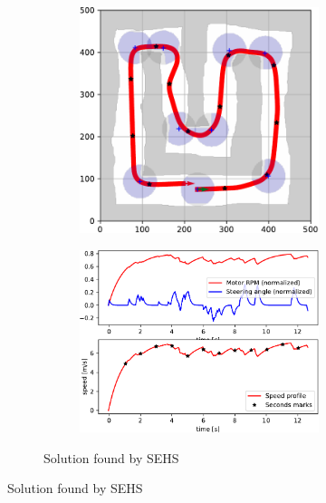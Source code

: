 \begin{figure}[!tbp]
	\vspace{0.75cm}

	\begin{subfigure}[t]{\textwidth}
		\begin{subfigure}[c]{0.54\textwidth}
			\includegraphics[width=\textwidth]{../img/experiments/u-sehs-trajectory}
		\end{subfigure}
		\hfill
		\begin{subfigure}[c]{0.45\textwidth}
			\includegraphics[width=\textwidth]{../img/experiments/u-sehs-actuators}
		\end{subfigure}
		\caption{Solution found by SEHS}
		\label{fig:u-sehs}
	\end{subfigure}
	

\end{figure}
